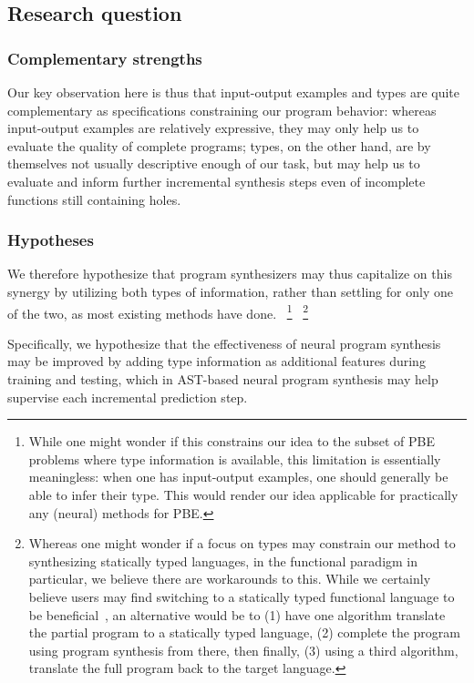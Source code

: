 \documentclass{article}
\begin{document}
\subsection{Research question}

\subsubsection{Complementary strengths}

Our key observation here is thus that input-output examples and types are quite complementary as specifications constraining our program behavior:
whereas input-output examples are relatively expressive, they may only help us to evaluate the quality of complete programs;
types, on the other hand, are by themselves not usually descriptive enough of our task,
but may help us to evaluate and inform further incremental synthesis steps even of incomplete functions still containing holes.

\subsubsection{Hypotheses}

We therefore hypothesize that program synthesizers may thus capitalize on this synergy by utilizing both types of information,
rather than settling for only one of the two, as most existing methods have done.%
~\footnote{
    While one might wonder if this constrains our idea to the subset of PBE problems where type information is available,
    this limitation is essentially meaningless: when one has input-output examples, one should generally be able to infer their type.
    This would render our idea applicable for practically any (neural) methods for PBE.
}%
~\footnote{
    Whereas one might wonder if a focus on types may constrain our method to synthesizing statically typed languages,
    in the functional paradigm in particular, we believe there are workarounds to this.
    While we certainly believe users may find switching to a statically typed functional language to be beneficial~\citep{hughes1989functional},
    an alternative would be to (1) have one algorithm translate the partial program to a statically typed language,
    (2) complete the program using program synthesis from there,
    then finally, (3) using a third algorithm, translate the full program back to the target language.
}

Specifically, we hypothesize that the effectiveness of neural program synthesis may be improved by
adding type information as additional features during training and testing,
which in AST-based neural program synthesis may help supervise each incremental prediction step.
\end{document}

